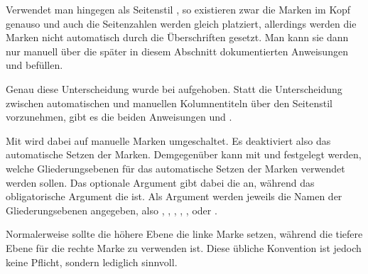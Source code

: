 {\begin{Explain}
      Verwendet man hingegen als Seitenstil
      , so existieren zwar die Marken im Kopf
      genauso und auch die Seitenzahlen werden gleich platziert, allerdings
      werden die Marken nicht automatisch durch die Überschriften gesetzt. Man
      kann sie dann nur manuell über die später in diesem Abschnitt
      dokumentierten Anweisungen
       und
       befüllen.
    \end{Explain}\par%
  }{%
  }%
  Genau diese Unterscheidung wurde bei %
  \iffalse \Package{scrpage2} und nun auch bei \fi%
  \hyperref[cha:scrlayer]{}%
  aufgehoben. Statt die Unterscheidung zwischen
  automatischen und manuellen
  Kolumnentiteln über den Seitenstil vorzunehmen, gibt es die beiden
  Anweisungen  und .

  Mit  wird dabei auf manuelle
  Marken umgeschaltet. Es deaktiviert also das automatische Setzen der
  Marken. Demgegenüber kann mit 
  und  festgelegt werden, welche Gliederungsebenen für das
  automatische Setzen der Marken verwendet werden sollen. Das optionale
  Argument gibt dabei die  an,
  während das obligatorische Argument die  ist. Als Argument werden jeweils die Namen der Gliederungsebenen
  angegeben, also , , ,
  , ,  oder
  .

  Normalerweise sollte die höhere Ebene die linke Marke setzen, während die
  tiefere Ebene für die rechte Marke zu verwenden ist. Diese übliche
  Konvention ist jedoch keine Pflicht, sondern lediglich sinnvoll.

